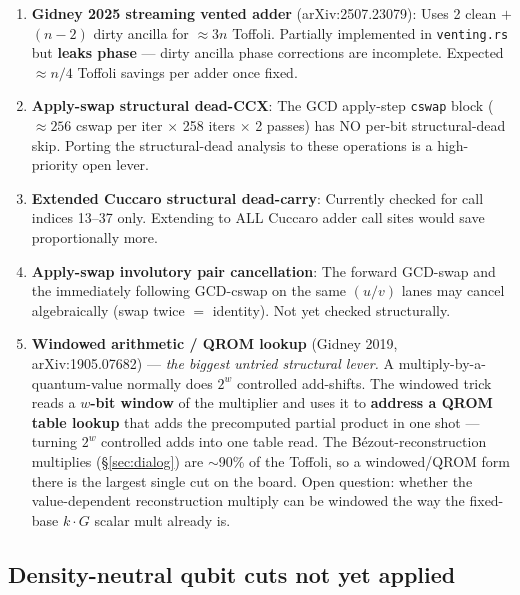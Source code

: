 \documentclass[11pt,a4paper]{article}
\begin{document}
\begin{enumerate}
  \item \textbf{Gidney 2025 streaming vented adder} (arXiv:2507.23079): Uses 2 clean $+$ $(n-2)$
    dirty ancilla for $\approx3n$ Toffoli. Partially implemented in \texttt{venting.rs} but
    \textbf{leaks phase} --- dirty ancilla phase corrections are incomplete. Expected $\approx n/4$
    Toffoli savings per adder once fixed.

  \item \textbf{Apply-swap structural dead-CCX}: The GCD apply-step \texttt{cswap} block
    ($\approx256$ cswap per iter $\times$ 258 iters $\times$ 2 passes) has NO per-bit
    structural-dead skip. Porting the structural-dead analysis to these operations is a
    high-priority open lever.

  \item \textbf{Extended Cuccaro structural dead-carry}: Currently checked for call indices 13--37
    only. Extending to ALL Cuccaro adder call sites would save proportionally more.

  \item \textbf{Apply-swap involutory pair cancellation}: The forward GCD-swap and the immediately
    following GCD-cswap on the same $(u/v)$ lanes may cancel algebraically (swap twice $=$ identity).
    Not yet checked structurally.

  \item \textbf{Windowed arithmetic / QROM lookup} (Gidney 2019, arXiv:1905.07682) --- \emph{the
    biggest untried structural lever.} A multiply-by-a-quantum-value normally does $2^w$ controlled
    add-shifts. The windowed trick reads a \textbf{$w$-bit window} of the multiplier and uses it to
    \textbf{address a QROM table lookup} that adds the precomputed partial product in one shot ---
    turning $2^w$ controlled adds into one table read. The B\'ezout-reconstruction multiplies
    (\S\ref{sec:dialog}) are $\sim$90\% of the Toffoli, so a windowed/QROM form there is the largest
    single cut on the board. Open question: whether the value-dependent reconstruction multiply can
    be windowed the way the fixed-base $k\cdot G$ scalar mult already is.
\end{enumerate}

\subsection{Density-neutral qubit cuts not yet applied}
\end{document}
